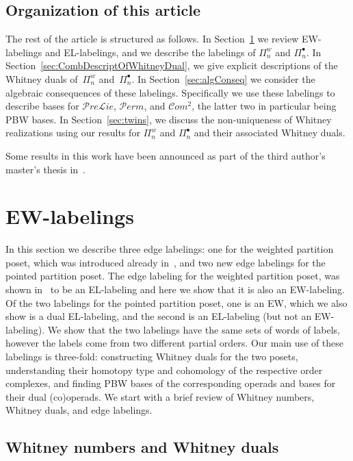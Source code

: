 \documentclass[11pt]{article}
\theoremstyle{definition}
\numberwithin{equation}{section}
\newcommand{\Perm}{\mathcal{P}erm}
\newcommand{\Com}{\mathcal{C}om}
\newcommand{\Prelie}{\mathcal{P}re\mathcal{L}ie}
\begin{document}
  

\subsection{Organization of this article}

The rest of the article is structured as follows. In Section~\ref{sec:EWLab} we review EW-labelings and EL-labelings, and we describe the labelings of $\Pi_n^w$ and $\Pi_n^\bullet$.  In Section~\ref{sec:CombDescriptOfWhitneyDual}, we give explicit descriptions of the Whitney duals of~$\Pi_n^w$ and~$\Pi_n^\bullet$.  In Section~\ref{sec:algConseq} we consider the algebraic consequences of these labelings. Specifically we use these labelings to describe bases for $\Prelie$, $\Perm$, and $\Com^2$, the latter two in particular being PBW bases.  In Section~\ref{sec:twins}, we discuss  the non-uniqueness  of Whitney realizations using our results for $\Pi_n^w$ and $\Pi_n^\bullet$ and their associated Whitney duals. 

Some results in this work have been announced as part of the third author's master's thesis in~\cite{QuicenoDuran2020}.
 



\section{EW-labelings}\label{sec:EWLab}
In this section we describe three edge labelings: one for the weighted partition poset, which was introduced already in~\cite{GonzalezDleonWachs2016}, and two new edge labelings for the pointed partition poset. The edge labeling for the weighted partition poset, was shown in~\cite{GonzalezDleonWachs2016} to be an EL-labeling and here we show that it is also an EW-labeling. Of the two labelings for the pointed partition poset, one is an EW, which we also show is a dual EL-labeling, and the second is an EL-labeling (but not an EW-labeling). We show that the two labelings have  the same sets of words of labels, however the labels come from two different partial orders.   Our main use of these labelings is three-fold: constructing Whitney duals for the two posets, understanding their homotopy type and cohomology of the respective order complexes, and finding PBW bases of the corresponding operads and bases for their dual (co)operads.    We start with a brief review of Whitney numbers, Whitney duals, and  edge labelings.

\subsection{Whitney numbers and Whitney duals}
\end{document}
